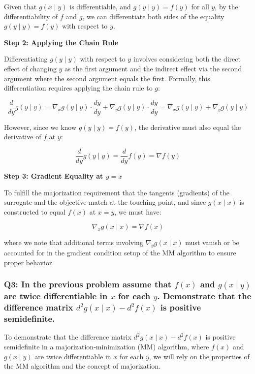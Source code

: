 \documentclass[8pt]{article}
\begin{document}
{Given that \(g(x \mid y)\) is differentiable, and \(g(y \mid y) = f(y)\) for all \(y\), by the differentiability of \(f\) and \(g\), we can differentiate both sides of the equality \(g(y \mid y) = f(y)\) with respect to \(y\). 

\textbf{Step 2: Applying the Chain Rule}

Differentiating \(g(y \mid y)\) with respect to \(y\) involves considering both the direct effect of changing \(y\) as the first argument and the indirect effect via the second argument where the second argument equals the first. Formally, this differentiation requires applying the chain rule to \(g\):

\[
\frac{d}{dy} g(y \mid y) = \nabla_x g(y \mid y) \cdot \frac{dy}{dy} + \nabla_y g(y \mid y) \cdot \frac{dy}{dy} = \nabla_x g(y \mid y) + \nabla_y g(y \mid y)
\]

However, since we know \(g(y \mid y) = f(y)\), the derivative must also equal the derivative of \(f\) at \(y\):

\[
\frac{d}{dy} g(y \mid y) = \frac{d}{dy} f(y) = \nabla f(y)
\]

\textbf{Step 3: Gradient Equality at \(y = x\)}

To fulfill the majorization requirement that the tangents (gradients) of the surrogate and the objective match at the touching point, and since \(g(x \mid x)\) is constructed to equal \(f(x)\) at \(x = y\), we must have:

\[
\nabla_x g(x \mid x) = \nabla f(x)
\]

where we note that additional terms involving \(\nabla_y g(x \mid x)\) must vanish or be accounted for in the gradient condition setup of the MM algorithm to ensure proper behavior.

\subsubsection*{Q3: In the previous problem assume that \(f(x)\) and \(g(x \mid y)\) are twice differentiable in \(x\) for each \(y\). Demonstrate that the difference matrix \(d^2 g(x \mid x) - d^2 f(x)\) is positive semidefinite.}

To demonstrate that the difference matrix \(d^2 g(x \mid x) - d^2 f(x)\) is positive semidefinite in a majorization-minimization (MM) algorithm, where \(f(x)\) and \(g(x \mid y)\) are twice differentiable in \(x\) for each \(y\), we will rely on the properties of the MM algorithm and the concept of majorization.

}
\end{document}
